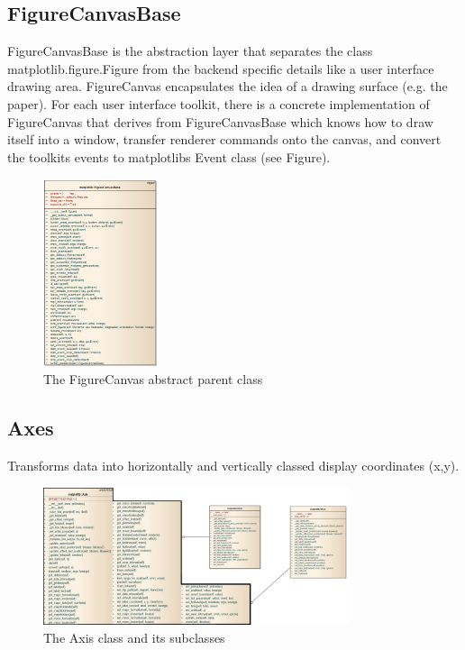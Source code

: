 \documentclass[pdftex,10pt,a4paper]{report}
\begin{document}
\subsection{FigureCanvasBase}

FigureCanvasBase is the abstraction layer that separates the class matplotlib.figure.Figure from the backend specific details like a user interface drawing area. FigureCanvas encapsulates the idea of a drawing surface (e.g. the paper). For each user interface toolkit, there is a concrete implementation of FigureCanvas that derives from FigureCanvasBase which knows how to draw itself into a window, transfer renderer commands onto the canvas, and convert the toolkits events to matplotlibs Event class (see Figure).

\begin{figure}[ht!]
        \centering
                \includegraphics[width=0.3\textwidth]{img/umls/nick/figcanbase}
        \caption{The FigureCanvas abstract parent class}\label{fig:artistExAgg}
\end{figure}

\subsection{Axes}
Transforms data into horizontally and vertically classed display coordinates (x,y).
\begin{figure}[ht!]
        \centering
                \includegraphics[width=0.8\textwidth]{img/umls/josh/axis}
        \caption{The Axis class and its subclasses}\label{fig:math text}
\end{figure}
\end{document}

